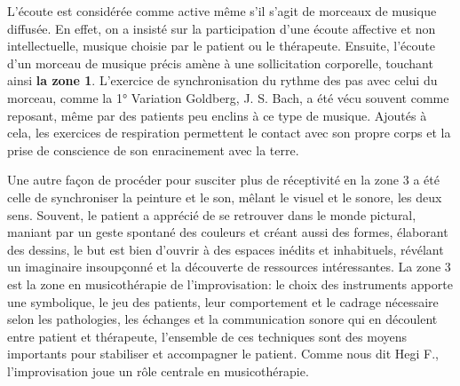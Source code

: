 L'écoute est considérée comme active même s'il s'agit de morceaux de musique diffusée. En effet,  on a 
insisté sur la participation d'une écoute affective et non intellectuelle, 
musique choisie par le patient ou le thérapeute.
Ensuite, l'écoute d'un morceau de musique précis amène à une sollicitation corporelle, touchant 
ainsi  \textbf{la zone 1}. 
L'exercice de synchronisation du rythme des pas avec celui du morceau, comme  la 1° 
Variation Goldberg, J. S. Bach,  a été vécu souvent comme reposant, même par des patients peu 
enclins à ce type 
de musique. Ajoutés à cela, les exercices de respiration 
permettent le contact avec 
son propre corps et la prise de conscience de son enracinement avec la terre.


Une autre façon de procéder pour susciter plus de réceptivité en la zone 3 a été celle de 
synchroniser la 
peinture et 
le son, mêlant le visuel et le sonore, les deux sens.  Souvent, le patient a apprécié de se 
retrouver dans le monde 
pictural, maniant  par un geste spontané des couleurs et créant aussi des formes, élaborant des dessins,
le but est bien d'ouvrir à des espaces inédits et  inhabituels, révélant un imaginaire insoupçonné et 
la découverte de ressources intéressantes.
La zone 3 est la zone en musicothérapie de l'improvisation: le choix des instruments apporte une 
symbolique, 
le jeu des patients, leur comportement et  le cadrage nécessaire selon les pathologies, les 
échanges et la communication sonore qui en découlent entre patient et thérapeute, l'ensemble de ces 
techniques sont des moyens importants pour stabiliser et accompagner le patient. Comme nous dit Hegi 
F.,  l'improvisation joue un 
rôle centrale en musicothérapie.\autocite {hegi_improvisation_1993}
  

